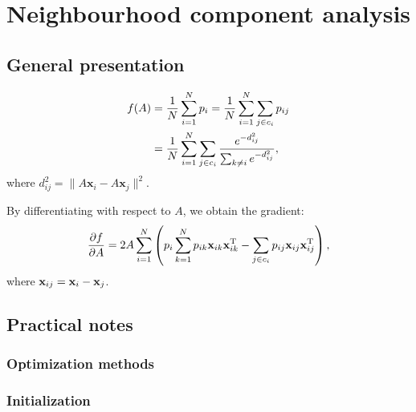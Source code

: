 \chapter{Neighbourhood component analysis}
\label{ch:nca}

\section{General presentation}
\label{sec:general-presentation}

\begin{align}
 f(A) &= \frac{1}{N}\sum_{i=1}^Np_i=\frac{1}{N}\sum_{i=1}^N\sum_{j\in c_i}p_{ij}\notag\\
 &= \frac{1}{N}\sum_{i=1}^N\sum_{j\in c_i}\frac{e^{-d_{ij}^2}}{\sum_{k\neq i}e^{-d_{ij}^2}}\label{eq:nca-obj},
\end{align}
 where $d_{ij}^2=\lVert A\mathbf{x}_i-A\mathbf{x}_j\lVert^2$.

By differentiating with respect to $A$, we obtain the gradient:
\begin{align}
  \frac{\partial f}{\partial A}=2A\sum_{i=1}^{N}\left(p_i\sum_{k=1}^Np_{ik}\mathbf{x}_{ik}\mathbf{x}_{ik}^{\textrm{T}} - \sum_{j\in c_i}p_{ij}\mathbf{x}_{ij}\mathbf{x}_{ij}^{\textrm{T}} \right)\label{eq:nca-grad},
\end{align}
where $\mathbf{x}_{ij} = \mathbf{x}_i - \mathbf{x}_j$. 


\section{Practical notes}

\subsection{Optimization methods}

\subsection{Initialization}
\label{subsec:initialization}

